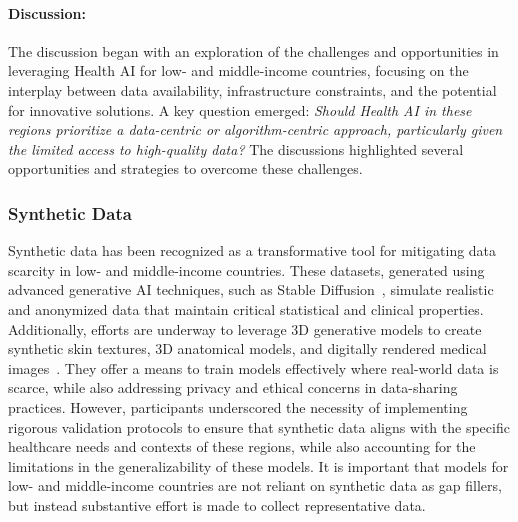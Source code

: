 

\paragraph{Discussion:}
The discussion began with an exploration of the challenges and opportunities in leveraging Health AI for low- and middle-income countries, focusing on the interplay between data availability, infrastructure constraints, and the potential for innovative solutions. A key question emerged: \textit{Should Health AI in these regions prioritize a data-centric or algorithm-centric approach, particularly given the limited access to high-quality data?} 
The discussions highlighted several opportunities and strategies to overcome these challenges.

\subsubsection{Synthetic Data}
Synthetic data has been recognized as a transformative tool for mitigating data scarcity in low- and middle-income countries. These datasets, generated using advanced generative AI techniques, such as Stable Diffusion~\citep{rombach2022high}, simulate realistic and anonymized data that maintain critical statistical and clinical properties. Additionally, efforts are underway to leverage 3D generative models to create synthetic skin textures, 3D anatomical models, and digitally rendered medical images~\citep{kim2024s}. They offer a means to train models effectively where real-world data is scarce, while also addressing privacy and ethical concerns in data-sharing practices. However, participants underscored the necessity of implementing rigorous validation protocols to ensure that synthetic data aligns with the specific healthcare needs and contexts of these regions, while also accounting for the limitations in the generalizability of these models. It is important that models for low- and middle-income countries are not reliant on synthetic data as gap fillers, but instead substantive effort is made to collect representative data.

